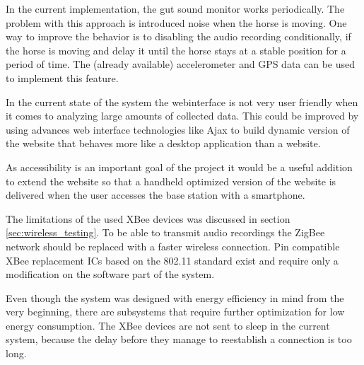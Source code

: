 In the current implementation, the gut sound monitor works periodically. The problem with this approach is introduced noise when the horse is moving. One way to improve the behavior is to disabling the audio recording conditionally, if the horse is moving and delay it until the horse stays at a stable position for a period of time. The (already available) accelerometer and GPS data can be used to implement this feature.

In the current state of the system the webinterface is not very user friendly when it comes to analyzing large amounts of collected data. This could be improved by using advances web interface technologies like Ajax to build dynamic version of the website that behaves more like a desktop application than a website.

As accessibility is an important goal of the project it would be a useful addition to extend the website so that a handheld optimized version of the website is delivered when the user accesses the base station with a smartphone.

The limitations of the used XBee devices was discussed in section \ref{sec:wireless_testing}. To be able to transmit audio recordings the ZigBee network should be replaced with a faster wireless connection. Pin compatible XBee replacement ICs based on the 802.11 standard exist and require only a modification on the software part of the system.

Even though the system was designed with energy efficiency in mind from the very beginning, there are subsystems that require further optimization for low energy consumption. The XBee devices are not sent to sleep in the current system, because the delay before they manage to reestablish a connection is too long.